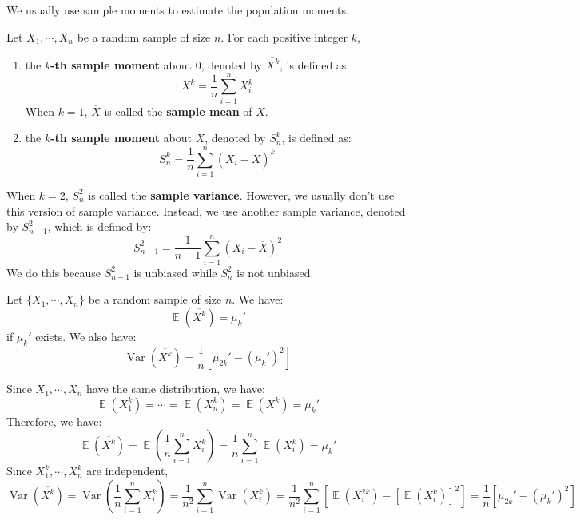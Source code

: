 \documentclass{huhtakm-template-book-v2}
\DeclareMathOperator{\E}{\mathbb{E}}
\DeclareMathOperator{\Var}{Var}
\begin{document}
We usually use sample moments to estimate the population moments.
\begin{defn}
	Let $X_{1},\cdots,X_{n}$ be a random sample of size $n$. For each positive integer $k$,
	\begin{enumerate}
		\item the \textbf{$k$-th sample moment} about $0$, denoted by $\overline{X^{k}}$, is defined as:
		\begin{equation*}
			\overline{X^{k}}=\frac{1}{n}\sum_{i=1}^{n}X_{i}^{k}
		\end{equation*}
		When $k=1$, $\overline{X}$ is called the \textbf{sample mean} of $X$.
		\item the \textbf{$k$-th sample moment} about $\overline{X}$, denoted by $S_{n}^{k}$, is defined as:
		\begin{equation*}
			S_{n}^{k}=\frac{1}{n}\sum_{i=1}^{n}(X_{i}-\overline{X})^{k}
		\end{equation*}
	\end{enumerate}
\end{defn}
\begin{eg}
	When $k=2$, $S_{n}^{2}$ is called the \textbf{sample variance}. However, we usually don't use this version of sample variance. Instead, we use another sample variance, denoted by $S_{n-1}^{2}$, which is defined by:
	\begin{equation*}
		S_{n-1}^{2}=\frac{1}{n-1}\sum_{i=1}^{n}(X_{i}-\overline{X})^{2}
	\end{equation*}
	We do this because $S_{n-1}^{2}$ is unbiased while $S_{n}^{2}$ is not unbiased.
\end{eg}

\newpage
\begin{lem}
	Let $\{X_{1},\cdots,X_{n}\}$ be a random sample of size $n$. We have:
	\begin{equation*}
		\E(\overline{X^{k}})=\mu_{k}'
	\end{equation*}
	if $\mu_{k}'$ exists. We also have:
	\begin{equation*}
		\Var(\overline{X^{k}})=\frac{1}{n}[\mu_{2k}'-(\mu_{k}')^{2}]
	\end{equation*}
\end{lem}
\begin{proofing}
	Since $X_{1},\cdots,X_{n}$ have the same distribution, we have:
	\begin{equation*}
		\E(X_{1}^{k})=\cdots=\E(X_{n}^{k})=\E(X^{k})=\mu_{k}'
	\end{equation*}
	Therefore, we have:
	\begin{equation*}
		\E(\overline{X^{k}})=\E\left(\frac{1}{n}\sum_{i=1}^{n}X_{i}^{k}\right)=\frac{1}{n}\sum_{i=1}^{n}\E(X_{i}^{k})=\mu_{k}'
	\end{equation*}
	Since $X_{1}^{k},\cdots,X_{n}^{k}$ are independent,
	\begin{equation*}
		\Var(\overline{X^{k}})=\Var\left(\frac{1}{n}\sum_{i=1}^{n}X_{i}^{k}\right)=\frac{1}{n^{2}}\sum_{i=1}^{n}\Var(X_{i}^{k})=\frac{1}{n^{2}}\sum_{i=1}^{n}\left[\E(X_{i}^{2k})-[\E(X_{i}^{k})]^{2}\right]=\frac{1}{n}[\mu_{2k}'-(\mu_{k}')^{2}]
	\end{equation*}
\end{proofing}
\end{document}
